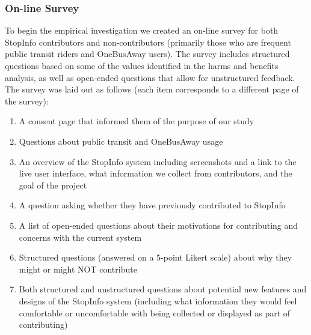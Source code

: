 \subsubsection{On-line Survey}
To begin the empirical investigation we created an on-line survey for both StopInfo contributors and non-contributors (primarily those who are frequent public transit riders and OneBusAway users). The survey includes structured questions based on some of the values identified in the harms and benefits analysis, as well as open-ended questions that allow for unstructured feedback. The survey was laid out as follows (each item corresponds to a different page of the survey):

\begin{enumerate}[leftmargin=8mm]
\item A consent page that informed them of the purpose of our study
\item Questions about public transit and OneBusAway usage
\item An overview of the StopInfo system including screenshots and a link to the live user interface, what information we collect from contributors, and the goal of the project
\item A question asking whether they have previously contributed to StopInfo
\item A list of open-ended questions about their motivations for contributing and concerns with the current system
\item Structured questions (answered on a 5-point Likert scale) about why they might or might NOT contribute 
\item Both structured and unstructured questions about potential new features and designs of the StopInfo system (including what information they would feel comfortable or uncomfortable with being collected or displayed as part of contributing)
\end{enumerate}

